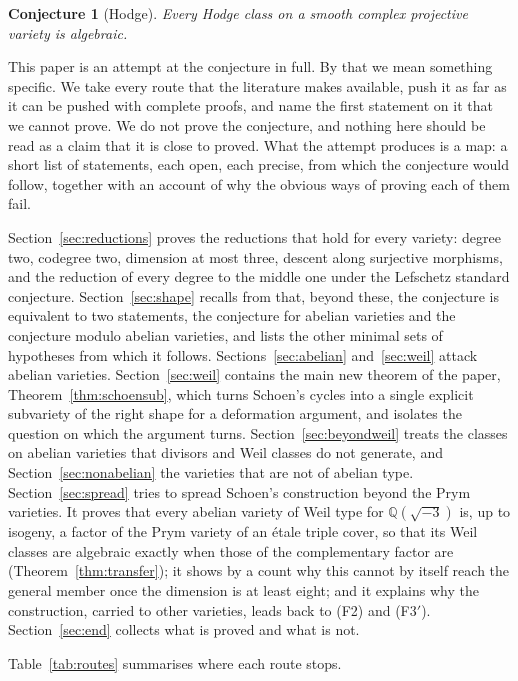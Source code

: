 \documentclass[11pt]{amsart}
\newtheorem{conjecture}[theorem]{Conjecture}
\theoremstyle{definition}
\theoremstyle{remark}
\newcommand{\QQ}{\mathbb{Q}}
\begin{document}
\begin{conjecture}[Hodge]
Every Hodge class on a smooth complex projective variety is algebraic.
\end{conjecture}

This paper is an attempt at the conjecture in full. By that we mean
something specific. We take every route that the literature makes
available, push it as far as it can be pushed with complete proofs, and
name the first statement on it that we cannot prove. We do not prove the
conjecture, and nothing here should be read as a claim that it is close to
proved. What the attempt produces is a map: a short list of statements, each
open, each precise, from which the conjecture would follow, together with
an account of why the obvious ways of proving each of them fail.

Section~\ref{sec:reductions} proves the reductions that hold for every
variety: degree two, codegree two, dimension at most three, descent along
surjective morphisms, and the reduction of every degree to the middle one
under the Lefschetz standard conjecture. Section~\ref{sec:shape} recalls
from \cite{BhH8} that, beyond these, the conjecture is equivalent to two
statements, the conjecture for abelian varieties and the conjecture modulo
abelian varieties, and lists the other minimal sets of hypotheses from which
it follows. Sections~\ref{sec:abelian} and~\ref{sec:weil} attack abelian
varieties. Section~\ref{sec:weil} contains the main new theorem of the
paper, Theorem~\ref{thm:schoensub}, which turns Schoen's cycles into a
single explicit subvariety of the right shape for a deformation argument,
and isolates the question on which the argument turns.
Section~\ref{sec:beyondweil} treats the classes on abelian varieties that
divisors and Weil classes do not generate, and Section~\ref{sec:nonabelian}
the varieties that are not of abelian type. Section~\ref{sec:spread} tries
to spread Schoen's construction beyond the Prym varieties. It proves that
every abelian variety of Weil type for $\QQ(\sqrt{-3})$ is, up to isogeny, a
factor of the Prym variety of an \'etale triple cover, so that its Weil
classes are algebraic exactly when those of the complementary factor are
(Theorem~\ref{thm:transfer}); it shows by a count why this cannot by itself
reach the general member once the dimension is at least eight; and it
explains why the construction, carried to other varieties, leads back to
(F2) and (F3$'$). Section~\ref{sec:end} collects what is proved and what is
not.

Table~\ref{tab:routes} summarises where each route stops.
\end{document}
